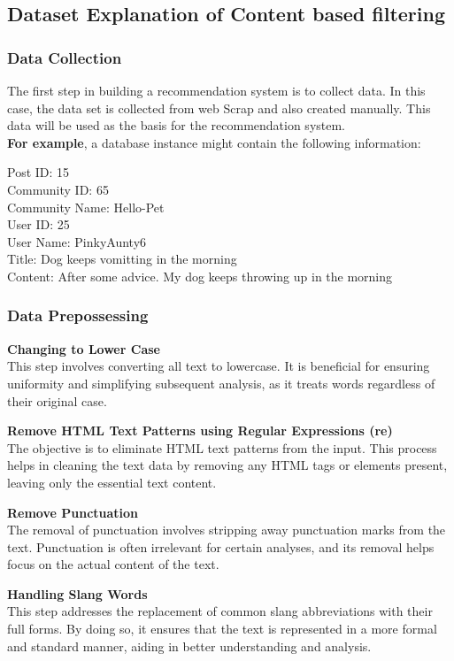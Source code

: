 \newpage
\subsection{Dataset Explanation of Content based filtering}
\subsubsection{Data Collection}
The first step in building a recommendation system is to collect data. In this case, the data set is collected from web Scrap and also created manually.  This data will be used as the basis for the recommendation system.\\
\textbf{For example}, a database instance might contain the following information:

\noindent Post ID: 15\\
Community ID: 65 \\
Community Name: Hello-Pet\\
User ID: 25\\
User Name: PinkyAunty6\\
Title: Dog keeps vomitting in the morning\\
Content: After some advice. My dog keeps throwing up in the morning


\subsubsection{Data Prepossessing}
\textbf{Changing to Lower Case}\\
This step involves converting all text to lowercase. It is beneficial for ensuring uniformity and simplifying subsequent analysis, as it treats words regardless of their original case.

\noindent\textbf{Remove HTML Text Patterns using Regular Expressions (re)}\\
The objective is to eliminate HTML text patterns from the input. This process helps in cleaning the text data by removing any HTML tags or elements present, leaving only the essential text content.

\noindent\textbf{Remove Punctuation}\\
The removal of punctuation involves stripping away punctuation marks from the text. Punctuation is often irrelevant for certain analyses, and its removal helps focus on the actual content of the text.

\noindent\textbf{Handling Slang Words}\\
This step addresses the replacement of common slang abbreviations with their full forms. By doing so, it ensures that the text is represented in a more formal and standard manner, aiding in better understanding and analysis.

